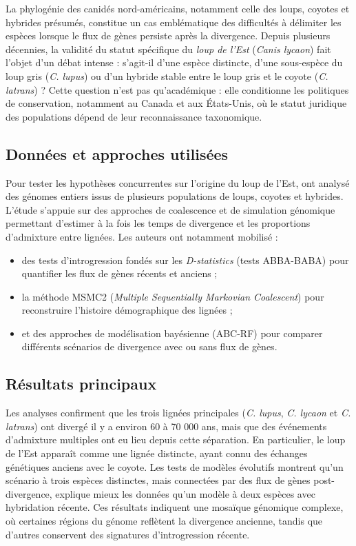 \documentclass[12pt,a4paper]{article}
\begin{document}
La phylogénie des canidés nord-américains, notamment celle des loups, coyotes et hybrides présumés, constitue un cas emblématique des difficultés à délimiter les espèces lorsque le flux de gènes persiste après la divergence.
Depuis plusieurs décennies, la validité du statut spécifique du \textit{loup de l’Est} (\textit{Canis lycaon}) fait l’objet d’un débat intense : s’agit-il d’une espèce distincte, d’une sous-espèce du loup gris (\textit{C. lupus}) ou d’un hybride stable entre le loup gris et le coyote (\textit{C. latrans}) ?
Cette question n’est pas qu’académique : elle conditionne les politiques de conservation, notamment au Canada et aux États-Unis, où le statut juridique des populations dépend de leur reconnaissance taxonomique.

\subsection{Données et approches utilisées \parencite{vilaca-2023}}

Pour tester les hypothèses concurrentes sur l’origine du loup de l’Est, \textcite{vilaca-2023} ont analysé des génomes entiers issus de plusieurs populations de loups, coyotes et hybrides.
L’étude s’appuie sur des approches de coalescence et de simulation génomique permettant d’estimer à la fois les temps de divergence et les proportions d’admixture entre lignées.
Les auteurs ont notamment mobilisé :
\begin{itemize}
    \item des tests d’introgression fondés sur les \textit{D-statistics} (tests ABBA-BABA) pour quantifier les flux de gènes récents et anciens ;
    \item la méthode MSMC2 (\textit{Multiple Sequentially Markovian Coalescent}) pour reconstruire l’histoire démographique des lignées ;
    \item et des approches de modélisation bayésienne (ABC-RF) pour comparer différents scénarios de divergence avec ou sans flux de gènes.
\end{itemize}

\subsection{Résultats principaux}

Les analyses confirment que les trois lignées principales (\textit{C. lupus}, \textit{C. lycaon} et \textit{C. latrans}) ont divergé il y a environ 60 à 70 000 ans, mais que des événements d’admixture multiples ont eu lieu depuis cette séparation.
En particulier, le loup de l’Est apparaît comme une lignée distincte, ayant connu des échanges génétiques anciens avec le coyote.
Les tests de modèles évolutifs montrent qu’un scénario à trois espèces distinctes, mais connectées par des flux de gènes post-divergence, explique mieux les données qu’un modèle à deux espèces avec hybridation récente.
Ces résultats indiquent une mosaïque génomique complexe, où certaines régions du génome reflètent la divergence ancienne, tandis que d’autres conservent des signatures d’introgression récente.
\end{document}

